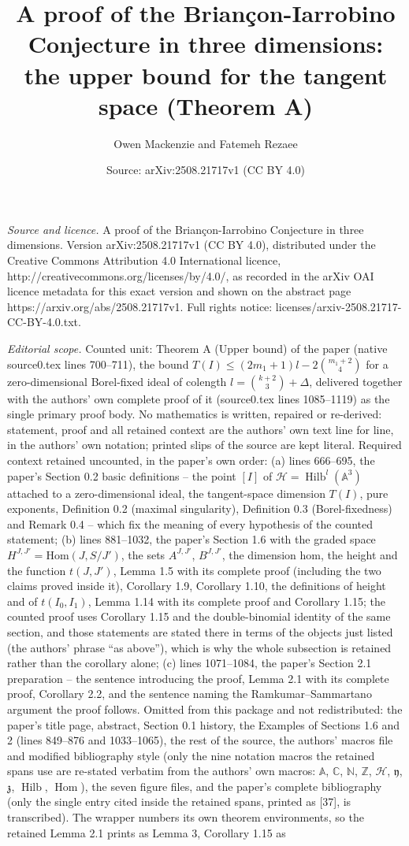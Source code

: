 \documentclass[10pt,a4paper]{amsart}
\title[Theorem A of arXiv:2508.21717]{A proof of the Brian\c{c}on-Iarrobino Conjecture in three dimensions: the upper bound for the tangent space (Theorem A)}
\author{Owen Mackenzie and Fatemeh Rezaee}
\date{Source: arXiv:2508.21717v1 (CC BY 4.0)}
\newcommand{\BA}{{\mathbb{A}}}
\newcommand{\BC}{{\mathbb{C}}}
\newcommand{\BN}{{\mathbb{N}}}
\newcommand{\BZ}{{\mathbb{Z}}}
\newcommand{\CH}{{\mathcal H}}
\newcommand{\Fy}{{\mathfrak{y}}}
\newcommand{\Fz}{{\mathfrak{z}}}
\DeclareMathOperator{\Hilb}{Hilb}
\newcommand\Hom{\operatorname{Hom}}
\begin{document}
\maketitle
\noindent\emph{Source and licence.} A proof of the Brian\c{c}on-Iarrobino Conjecture in three dimensions. Version arXiv:2508.21717v1 (CC BY 4.0), distributed under the Creative Commons Attribution 4.0 International licence, http://creativecommons.org/licenses/by/4.0/, as recorded in the arXiv OAI licence metadata for this exact version and shown on the abstract page https://arxiv.org/abs/2508.21717v1. Full rights notice: licenses/arxiv-2508.21717-CC-BY-4.0.txt.\par\smallskip
\noindent\textit{Editorial scope.} Counted unit: Theorem A (Upper bound) of the paper (native source0.tex lines 700--711), the bound $T(I)\leq(2m_1+1)l-2\binom{m_1+2}{4}$ for a zero-dimensional Borel-fixed ideal of colength $l=\binom{k+2}{3}+\Delta$, delivered together with the authors' own complete proof of it (source0.tex lines 1085--1119) as the single primary proof body. No mathematics is written, repaired or re-derived: statement, proof and all retained context are the authors' own text line for line, in the authors' own notation; printed slips of the source are kept literal. Required context retained uncounted, in the paper's own order: (a) lines 666--695, the paper's Section 0.2 basic definitions -- the point $[I]$ of $\CH=\Hilb^l(\BA^3)$ attached to a zero-dimensional ideal, the tangent-space dimension $T(I)$, pure exponents, Definition 0.2 (maximal singularity), Definition 0.3 (Borel-fixedness) and Remark 0.4 -- which fix the meaning of every hypothesis of the counted statement; (b) lines 881--1032, the paper's Section 1.6 with the graded space $H^{J,J'}=\mathrm{Hom}(J,S/J')$, the sets $A^{J,J'}$, $B^{J,J'}$, the dimension $\mathrm{hom}$, the height and the function $t(J,J')$, Lemma 1.5 with its complete proof (including the two claims proved inside it), Corollary 1.9, Corollary 1.10, the definitions of height and of $t(I_0,I_1)$, Lemma 1.14 with its complete proof and Corollary 1.15; the counted proof uses Corollary 1.15 and the double-binomial identity of the same section, and those statements are stated there in terms of the objects just listed (the authors' phrase ``as above''), which is why the whole subsection is retained rather than the corollary alone; (c) lines 1071--1084, the paper's Section 2.1 preparation -- the sentence introducing the proof, Lemma 2.1 with its complete proof, Corollary 2.2, and the sentence naming the Ramkumar--Sammartano argument the proof follows. Omitted from this package and not redistributed: the paper's title page, abstract, Section 0.1 history, the Examples of Sections 1.6 and 2 (lines 849--876 and 1033--1065), the rest of the source, the authors' macros file and modified bibliography style (only the nine notation macros the retained spans use are re-stated verbatim from the authors' own macros: $\BA$, $\BC$, $\BN$, $\BZ$, $\CH$, $\Fy$, $\Fz$, $\Hilb$, $\Hom$), the seven figure files, and the paper's complete bibliography (only the single entry cited inside the retained spans, printed as [37], is transcribed). The wrapper numbers its own theorem environments, so the retained Lemma 2.1 prints as Lemma 3, Corollary 1.15 as 
\end{document}
